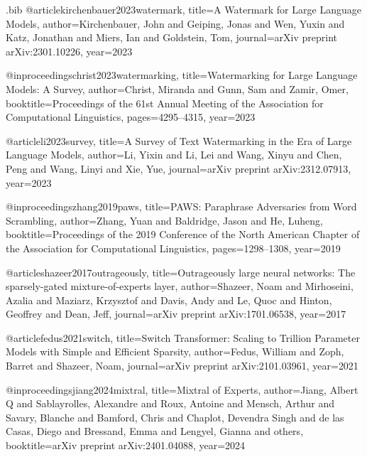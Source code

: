 \usepackage{filecontents}

\begin{filecontents}{\jobname.bib}
@article{kirchenbauer2023watermark,
  title={A Watermark for Large Language Models},
  author={Kirchenbauer, John and Geiping, Jonas and Wen, Yuxin and Katz, Jonathan and Miers, Ian and Goldstein, Tom},
  journal={arXiv preprint arXiv:2301.10226},
  year={2023}
}

@inproceedings{christ2023watermarking,
  title={Watermarking for Large Language Models: A Survey},
  author={Christ, Miranda and Gunn, Sam and Zamir, Omer},
  booktitle={Proceedings of the 61st Annual Meeting of the Association for Computational Linguistics},
  pages={4295--4315},
  year={2023}
}

@article{li2023survey,
  title={A Survey of Text Watermarking in the Era of Large Language Models},
  author={Li, Yixin and Li, Lei and Wang, Xinyu and Chen, Peng and Wang, Linyi and Xie, Yue},
  journal={arXiv preprint arXiv:2312.07913},
  year={2023}
}

@inproceedings{zhang2019paws,
  title={PAWS: Paraphrase Adversaries from Word Scrambling},
  author={Zhang, Yuan and Baldridge, Jason and He, Luheng},
  booktitle={Proceedings of the 2019 Conference of the North American Chapter of the Association for Computational Linguistics},
  pages={1298--1308},
  year={2019}
}

@article{shazeer2017outrageously,
  title={Outrageously large neural networks: The sparsely-gated mixture-of-experts layer},
  author={Shazeer, Noam and Mirhoseini, Azalia and Maziarz, Krzysztof and Davis, Andy and Le, Quoc and Hinton, Geoffrey and Dean, Jeff},
  journal={arXiv preprint arXiv:1701.06538},
  year={2017}
}

@article{fedus2021switch,
  title={Switch Transformer: Scaling to Trillion Parameter Models with Simple and Efficient Sparsity},
  author={Fedus, William and Zoph, Barret and Shazeer, Noam},
  journal={arXiv preprint arXiv:2101.03961},
  year={2021}
}

@inproceedings{jiang2024mixtral,
  title={Mixtral of Experts},
  author={Jiang, Albert Q and Sablayrolles, Alexandre and Roux, Antoine and Mensch, Arthur and Savary, Blanche and Bamford, Chris and Chaplot, Devendra Singh and de las Casas, Diego and Bressand, Emma and Lengyel, Gianna and others},
  booktitle={arXiv preprint arXiv:2401.04088},
  year={2024}
}


\end{filecontents}
